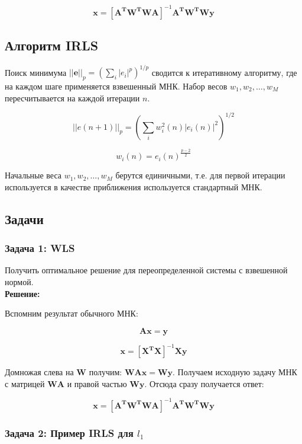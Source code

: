 {\[
    \boldsymbol{x} = \left[ \boldsymbol{A^T W^T W A} \right]^{-1} \boldsymbol{A^T W^T W y}
\]

\subsection{Алгоритм \textbf{IRLS}}

Поиск минимума $||\boldsymbol{e}||_p = \left( \sum_i |e_i|^p \right)^{1/p}$ сводится к итеративному алгоритму, где на каждом шаге применяется взвешенный МНК. Набор весов $w_1, w_2, \dots, w_M$ пересчитывается на каждой итерации $n$.

\[
||e(n +1)||_p = \left( \sum_i w_i^2(n) |e_i(n)|^2 \right)^{1/2}
\]

\[
w_i(n) = e_i(n)^{\frac{p - 2}{2}}
\]

Начальные веса $w_1, w_2, \dots, w_M$ берутся единичными, т.е. для первой итерации используется в качестве приближения используется стандартный МНК.

\subsection{Задачи}

\subsubsection{Задача 1: WLS}

Получить оптимальное решение для переопределенной системы с взвешенной нормой. \\

\textbf{Решение:}

Вспомним результат обычного МНК:

\[
    \boldsymbol{A} \boldsymbol{x} = \boldsymbol{y}
\]

\[
    \boldsymbol{x} = \left[\boldsymbol{X^T X}\right]^{-1} \boldsymbol{X y}
\]

Домножая слева на $\boldsymbol{W}$ получим: $\boldsymbol{W} \boldsymbol{A} \boldsymbol{x} = \boldsymbol{W} \boldsymbol{y}$. Получаем исходную задачу МНК с матрицей $\boldsymbol{W} \boldsymbol{A}$ и правой частью $\boldsymbol{W} \boldsymbol{y}$. Отсюда сразу получается ответ:

\[
    \boldsymbol{x} = \left[ \boldsymbol{A^T W^T W A} \right]^{-1} \boldsymbol{A^T W^T W y}
\]

\subsubsection{Задача 2: Пример IRLS для $l_1$}

}
